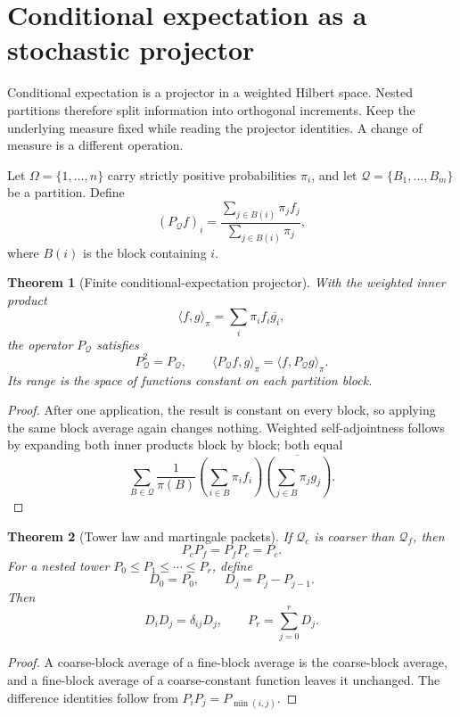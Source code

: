 \documentclass[11pt,letterpaper]{article}
\newtheorem{theorem}{Theorem}[section]
\theoremstyle{plain}
\theoremstyle{plain}
\theoremstyle{plain}
\theoremstyle{definition}
\theoremstyle{definition}
\theoremstyle{definition}
\theoremstyle{definition}
\theoremstyle{definition}
\theoremstyle{remark}
\theoremstyle{remark}
\theoremstyle{remark}
\theoremstyle{remark}
\theoremstyle{remark}
\theoremstyle{remark}
\let\KomorebiPrimitiveMathcal\mathcal
\renewcommand{\mathcal}[1]{{\KomorebiPrimitiveMathcal{#1}}}
\begin{document}
\FloatBarrier
\section{Conditional expectation as a stochastic projector}\label{core:section:06}
\begin{readerroadmap}
Conditional expectation is a projector in a weighted Hilbert space. Nested partitions therefore split information into orthogonal increments. Keep the underlying measure fixed while reading the projector identities. A change of measure is a different operation.
\end{readerroadmap}


Let $\Omega=\{1,\ldots,n\}$ carry strictly positive probabilities $\pi_i$, and let $\mathcal Q=\{B_1,\ldots,B_m\}$ be a partition. Define
\[
(P_{\mathcal Q}f)_i
=
\frac{\sum_{j\in B(i)}\pi_jf_j}{\sum_{j\in B(i)}\pi_j},
\]
where $B(i)$ is the block containing $i$.

\begin{theorem}[Finite conditional-expectation projector]\label{core:record:014}
With the weighted inner product
\[
\langle f,g\rangle_\pi=\sum_i\pi_if_i\overline{g_i},
\]
the operator $P_{\mathcal Q}$ satisfies
\[
P_{\mathcal Q}^2=P_{\mathcal Q},
\qquad
\langle P_{\mathcal Q}f,g\rangle_\pi
=
\langle f,P_{\mathcal Q}g\rangle_\pi.
\]
Its range is the space of functions constant on each partition block.
\end{theorem}

\begin{proof}
After one application, the result is constant on every block, so applying the same block average again changes nothing. Weighted self-adjointness follows by expanding both inner products block by block; both equal
\[
\sum_{B\in\mathcal Q}
\frac{1}{\pi(B)}
\left(\sum_{i\in B}\pi_i f_i\right)
\overline{\left(\sum_{j\in B}\pi_j g_j\right)}.
\]
\end{proof}

\begin{theorem}[Tower law and martingale packets]\label{core:record:015}
If $\mathcal Q_c$ is coarser than $\mathcal Q_f$, then
\[
\boxed{
P_cP_f=P_fP_c=P_c.
}
\]
For a nested tower $P_0\le P_1\le\cdots\le P_r$, define
\[
D_0=P_0,
\qquad
D_j=P_j-P_{j-1}.
\]
Then
\[
D_iD_j=\delta_{ij}D_j,
\qquad
P_r=\sum_{j=0}^rD_j.
\]
\end{theorem}

\begin{proof}
A coarse-block average of a fine-block average is the coarse-block average, and a fine-block average of a coarse-constant function leaves it unchanged. The difference identities follow from $P_iP_j=P_{\min(i,j)}$.
\end{proof}
\end{document}
